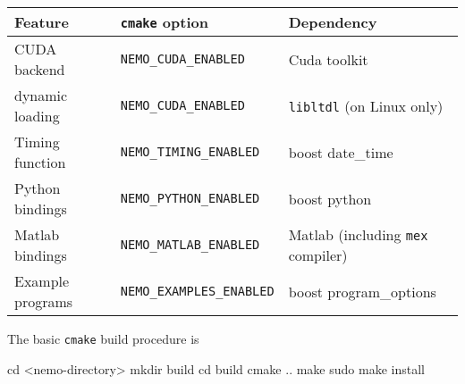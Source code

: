 \documentclass[a4paper]{article}
\newcommand{\code}[1]{\texttt{#1}}
\newcommand{\command}[1]{\texttt{#1}}
\newcommand{\library}[1]{\texttt{#1}}
\newcommand{\cpp}{C\nolinebreak\hspace{-.05em}\raisebox{.4ex}{\tiny\bf +}\nolinebreak\hspace{-.10em}\raisebox{.4ex}{\tiny\bf +}}
\begin{document}
\begin{tabular}{p{}lp{}}
\hline
Feature & \command{cmake} option & Dependency \\
\hline
CUDA backend & \command{NEMO\_CUDA\_ENABLED} & Cuda toolkit \\
\hspace{2em}dynamic loading & \command{NEMO\_CUDA\_ENABLED} & \command{libltdl} (on Linux only) \\
Timing function & \command{NEMO\_TIMING\_ENABLED} & boost date\_time \\ 
Python bindings & \command{NEMO\_PYTHON\_ENABLED} & boost python \\
Matlab bindings & \command{NEMO\_MATLAB\_ENABLED} & Matlab (including \command{mex} compiler) \\
Example programs & \command{NEMO\_EXAMPLES\_ENABLED} & boost program\_options \\ 
\hline
\end{tabular}


The basic \command{cmake} build procedure is 

\begin{shell}
cd <nemo-directory>
mkdir build
cd build
cmake ..
make
sudo make install
\end{shell}











\end{document}
